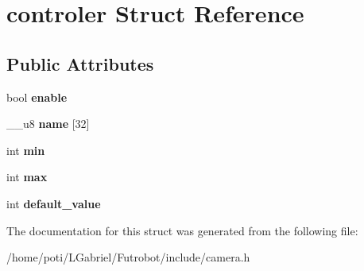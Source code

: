 \hypertarget{structcontroler}{}\section{controler Struct Reference}
\label{structcontroler}
\subsection*{Public Attributes}
\begin{DoxyCompactItemize}
\item 
bool {\bfseries enable}\hypertarget{structcontroler_a736a39f2425a0a37a2b187eca6f40e94}{}\label{structcontroler_a736a39f2425a0a37a2b187eca6f40e94}

\item 
\+\_\+\+\_\+u8 {\bfseries name} \mbox{[}32\mbox{]}\hypertarget{structcontroler_a86f731315553365ea666d5ccf8d6eb5f}{}\label{structcontroler_a86f731315553365ea666d5ccf8d6eb5f}

\item 
int {\bfseries min}\hypertarget{structcontroler_ace2f64ba594b9c5e6e7c03240bcacf29}{}\label{structcontroler_ace2f64ba594b9c5e6e7c03240bcacf29}

\item 
int {\bfseries max}\hypertarget{structcontroler_a82656300c237998a839498e50eb0060f}{}\label{structcontroler_a82656300c237998a839498e50eb0060f}

\item 
int {\bfseries default\+\_\+value}\hypertarget{structcontroler_a4afb56e8a53a010a197fcf2d652ee148}{}\label{structcontroler_a4afb56e8a53a010a197fcf2d652ee148}

\end{DoxyCompactItemize}


The documentation for this struct was generated from the following file\+:\begin{DoxyCompactItemize}
\item 
/home/poti/\+L\+Gabriel/\+Futrobot/include/camera.\+h\end{DoxyCompactItemize}
